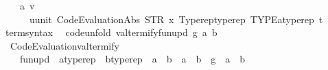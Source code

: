 \begin{isabellebody}
\ \ \ \ \ \ {\isacharparenleft}{\kern0pt}{\isasymlambda}{\isacharunderscore}{\kern0pt}{\isacharcolon}{\kern0pt}{\isacharcolon}{\kern0pt}{\isacharprime}{\kern0pt}a{\isachardot}{\kern0pt}\ v{\isacharcomma}{\kern0pt}\isanewline
\ \ \ \ \ \ \ \ {\isasymlambda}u{\isacharcolon}{\kern0pt}{\isacharcolon}{\kern0pt}unit{\isachardot}{\kern0pt}\ Code{\isacharunderscore}{\kern0pt}Evaluation{\isachardot}{\kern0pt}Abs\ {\isacharparenleft}{\kern0pt}STR\ {\isacharprime}{\kern0pt}{\isacharprime}{\kern0pt}x{\isacharprime}{\kern0pt}{\isacharprime}{\kern0pt}{\isacharparenright}{\kern0pt}\ {\isacharparenleft}{\kern0pt}Typerep{\isachardot}{\kern0pt}typerep\ TYPE{\isacharparenleft}{\kern0pt}{\isacharprime}{\kern0pt}a{\isacharcolon}{\kern0pt}{\isacharcolon}{\kern0pt}typerep{\isacharparenright}{\kern0pt}{\isacharparenright}{\kern0pt}\ {\isacharparenleft}{\kern0pt}t\ {\isacharparenleft}{\kern0pt}{\isacharparenright}{\kern0pt}{\isacharparenright}{\kern0pt}{\isacharparenright}{\kern0pt}{\isacharparenright}{\kern0pt}{\isachardoublequoteclose}\isanewline
\isanewline
{}\isamarkupfalse%
\isanewline
\ \ \ term{\isacharunderscore}{\kern0pt}syntax\isanewline
{}\isanewline
\isanewline
{}\isamarkupfalse%
\isanewline
\ \ {\isacharbrackleft}{\kern0pt}code{\isacharunderscore}{\kern0pt}unfold{\isacharbrackright}{\kern0pt}{\isacharcolon}{\kern0pt}\ {\isachardoublequoteopen}valtermify{\isacharunderscore}{\kern0pt}fun{\isacharunderscore}{\kern0pt}upd\ g\ a\ b\ {\isacharequal}{\kern0pt}\isanewline
\ \ \ \ Code{\isacharunderscore}{\kern0pt}Evaluation{\isachardot}{\kern0pt}valtermify\isanewline
\ \ \ \ \ \ {\isacharparenleft}{\kern0pt}fun{\isacharunderscore}{\kern0pt}upd\ {\isacharcolon}{\kern0pt}{\isacharcolon}{\kern0pt}\ {\isacharparenleft}{\kern0pt}{\isacharprime}{\kern0pt}a{\isacharcolon}{\kern0pt}{\isacharcolon}{\kern0pt}typerep\ {\isasymRightarrow}\ {\isacharprime}{\kern0pt}b{\isacharcolon}{\kern0pt}{\isacharcolon}{\kern0pt}typerep{\isacharparenright}{\kern0pt}\ {\isasymRightarrow}\ {\isacharprime}{\kern0pt}a\ {\isasymRightarrow}\ {\isacharprime}{\kern0pt}b\ {\isasymRightarrow}\ {\isacharprime}{\kern0pt}a\ {\isasymRightarrow}\ {\isacharprime}{\kern0pt}b{\isacharparenright}{\kern0pt}\ {\isacharbraceleft}{\kern0pt}{\isasymcdot}{\isacharbraceright}{\kern0pt}\ g\ {\isacharbraceleft}{\kern0pt}{\isasymcdot}{\isacharbraceright}{\kern0pt}\ a\ {\isacharbraceleft}{\kern0pt}{\isasymcdot}{\isacharbraceright}{\kern0pt}\ b{\isachardoublequoteclose}\isanewline
\isanewline
{}\isamarkupfalse%
\isanewline
\isanewline
{}\isamarkupfalse%

\end{isabellebody}
